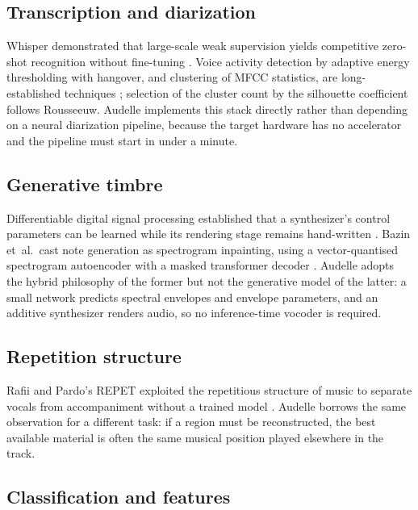 \documentclass[conference]{IEEEtran}
\begin{document}
\subsection{Transcription and diarization}

Whisper demonstrated that large-scale weak supervision yields competitive
zero-shot recognition without fine-tuning \cite{radford2022whisper}. Voice activity detection by
adaptive energy thresholding with hangover, and clustering of MFCC statistics,
are long-established techniques \cite{davis1990comparison}; selection of the cluster count by the
silhouette coefficient \cite{rousseeuw1987silhouettes} follows Rousseeuw. Audelle implements this stack
directly rather than depending on a neural diarization pipeline, because the
target hardware has no accelerator and the pipeline must start in under a minute.

\subsection{Generative timbre}

Differentiable digital signal processing established that a synthesizer's
control parameters can be learned while its rendering stage remains hand-written
\cite{hayes2024ddsp}. Bazin et~al.\ cast note generation as spectrogram inpainting, using a
vector-quantised spectrogram autoencoder with a masked transformer decoder \cite{bazin2020spectrogram}.
Audelle adopts the hybrid philosophy of the former but not the generative model
of the latter: a small network predicts spectral envelopes and envelope
parameters, and an additive synthesizer renders audio, so no inference-time
vocoder is required.

\subsection{Repetition structure}

Rafii and Pardo's REPET exploited the repetitious structure of music to separate
vocals from accompaniment without a trained model \cite{rafii2013repet}. Audelle borrows the same
observation for a different task: if a region must be reconstructed, the best
available material is often the same musical position played elsewhere in the
track.

\subsection{Classification and features}
\end{document}

